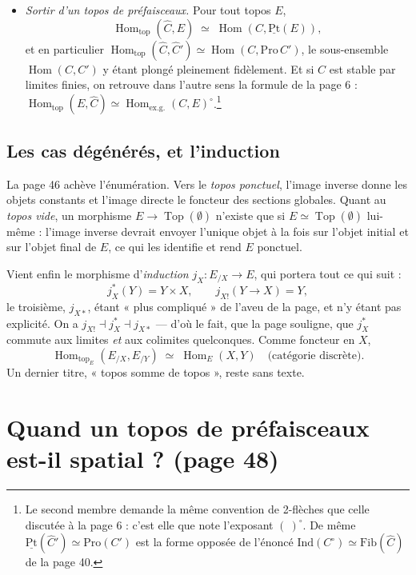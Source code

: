 \documentclass[11pt,a4paper]{article}
\begin{document}
\begin{itemize}
\item \emph{Sortir d'un topos de préfaisceaux.} Pour tout topos $E$,
\[
\operatorname{Hom}_{\mathrm{top}}(\widehat{C}, E) \;\simeq\;
\operatorname{Hom}(C, \underline{\mathrm{Pt}}(E)),
\]
et en particulier
$\operatorname{Hom}_{\mathrm{top}}(\widehat{C}, \widehat{C}') \simeq
\operatorname{Hom}(C, \mathrm{Pro}\,C')$, le sous-ensemble
$\operatorname{Hom}(C,C')$ y étant plongé pleinement fidèlement. Et si $C$ est
stable par limites finies, on retrouve dans l'autre sens la formule de la page 6 :
$\operatorname{Hom}_{\mathrm{top}}(E, \widehat{C}) \simeq
\operatorname{Hom}_{\mathrm{ex.g.}}(C, E)^{\circ}$.\footnote{Le second membre
demande la même convention de 2-flèches que celle discutée à la page 6 :
c'est elle que note l'exposant $(\ )^{\circ}$. De même
$\underline{\mathrm{Pt}}(\widehat{C}') \simeq \mathrm{Pro}(C')$ est la forme
opposée de l'énoncé $\mathrm{Ind}(C^{\circ}) \simeq \mathrm{Fib}(\widehat{C})$
de la page 40.}
\end{itemize}

\subsection*{Les cas dégénérés, et l'induction}

La page 46 achève l'énumération. Vers le \emph{topos ponctuel}, l'image inverse
donne les objets constants et l'image directe le foncteur des sections
globales. Quant au \emph{topos vide}, un morphisme $E \to
\operatorname{Top}(\emptyset)$ n'existe que si $E \simeq
\operatorname{Top}(\emptyset)$ lui-même : l'image inverse devrait envoyer
l'unique objet à la fois sur l'objet initial et sur l'objet final de $E$, ce
qui les identifie et rend $E$ ponctuel.

Vient enfin le morphisme d'\emph{induction} $j_{X} : E_{/X} \to E$, qui portera
tout ce qui suit :
\[
j_{X}^{*}(Y) = Y \times X, \qquad
j_{X!}(Y \to X) = Y,
\]
le troisième, $j_{X*}$, étant « plus compliqué » de l'aveu de la page, et
n'y étant pas explicité. On a $j_{X!} \dashv j_{X}^{*} \dashv j_{X*}$ — d'où le fait, que la page
souligne, que $j_{X}^{*}$ commute aux limites \emph{et} aux colimites
quelconques. Comme foncteur en $X$,
\[
\operatorname{Hom}_{\mathrm{top}_{E}}(E_{/X}, E_{/Y}) \;\simeq\;
\operatorname{Hom}_{E}(X,Y) \quad \text{(catégorie discrète)}.
\]
Un dernier titre, « topos somme de topos », reste sans texte.

\section*{Quand un topos de préfaisceaux est-il spatial ? (page 48)}
\end{document}
